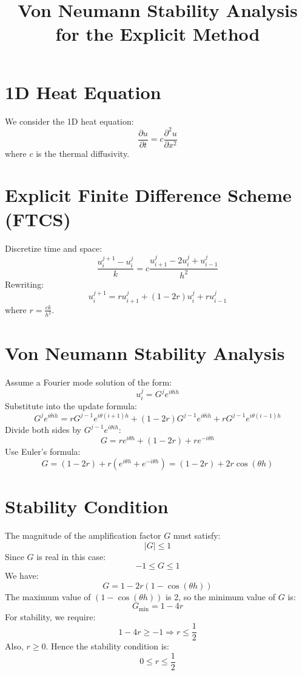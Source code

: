 \documentclass{article}
\title{Von Neumann Stability Analysis for the Explicit Method}
\author{}
\date{}
\begin{document}
\maketitle

\section*{1D Heat Equation}
We consider the 1D heat equation:
\[
\frac{\partial u}{\partial t} = c \frac{\partial^2 u}{\partial x^2}
\]
where \( c \) is the thermal diffusivity.

\section*{Explicit Finite Difference Scheme (FTCS)}
Discretize time and space:
\[
\frac{u_i^{j+1} - u_i^j}{k} = c \frac{u_{i+1}^j - 2u_i^j + u_{i-1}^j}{h^2}
\]
Rewriting:
\[
u_i^{j+1} = r u_{i+1}^j + (1 - 2r) u_i^j + r u_{i-1}^j
\]
where \( r = \frac{c k}{h^2} \).

\section*{Von Neumann Stability Analysis}
Assume a Fourier mode solution of the form:
\[
u_i^j = G^j e^{i \theta i h}
\]
Substitute into the update formula:
\[
G^j e^{i \theta i h} = r G^{j-1} e^{i \theta (i+1) h} + (1 - 2r) G^{j-1} e^{i \theta i h} + r G^{j-1} e^{i \theta (i-1) h}
\]
Divide both sides by \( G^{j-1} e^{i \theta i h} \):
\[
G = r e^{i \theta h} + (1 - 2r) + r e^{-i \theta h}
\]
Use Euler's formula:
\[
G = (1 - 2r) + r (e^{i \theta h} + e^{-i \theta h}) = (1 - 2r) + 2r \cos(\theta h)
\]

\section*{Stability Condition}
The magnitude of the amplification factor \( G \) must satisfy:
\[
|G| \leq 1
\]
Since \( G \) is real in this case:
\[
-1 \leq G \leq 1
\]
We have:
\[
G = 1 - 2r (1 - \cos(\theta h))
\]
The maximum value of \( (1 - \cos(\theta h)) \) is 2, so the minimum value of \( G \) is:
\[
G_{\text{min}} = 1 - 4r
\]
For stability, we require:
\[
1 - 4r \geq -1 \Rightarrow r \leq \frac{1}{2}
\]
Also, \( r \geq 0 \). Hence the stability condition is:
\[
0 \leq r \leq \frac{1}{2}
\]
\end{document}
